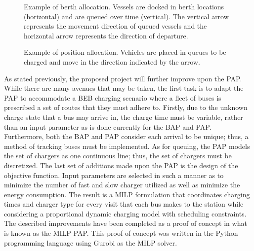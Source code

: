 \documentclass[ee,msthesis]{usuthesis}
\begin{document}
\begin{subfigures}
    \begin{figure}[htpb]
    \centering
        
        \caption{Example of berth allocation. Vessels are docked in berth locations (horizontal) and are queued over
          time (vertical). The vertical arrow represents the movement direction of queued vessels and the horizontal
          arrow represents the direction of departure.}
        \label{subfig:bapexample}
    \end{figure}
    \hfill

    \begin{figure}[htpb]
    \centering
        
        \caption{Example of position allocation. Vehicles are placed in queues to be charged and move in the direction
          indicated by the arrow.}
        \label{subfig:papexample}
    \end{figure}
\end{subfigures}

As stated previously, the proposed project will further improve upon the PAP. While there are many avenues that may be
taken, the first task is to adapt the PAP to accommodate a BEB charging scenario where a fleet of buses is prescribed a
set of routes that they must adhere to. Firstly, due to the unknown charge state that a bus may arrive in, the charge
time must be variable, rather than an input parameter as is done currently for the BAP and PAP. Furthermore, both the
BAP and PAP consider each arrival to be unique; thus, a method of tracking buses must be implemented. As for queuing,
the PAP models the set of chargers as one continuous line; thus, the set of chargers must be discretized. The last set
of additions made upon the PAP is the design of the objective function. Input parameters are selected in such a manner
as to minimize the number of fast and slow charger utilized as well as minimize the energy consumption. The result is a
MILP formulation that coordinates charging times and charger type for every visit that each bus makes to the station
while considering a proportional dynamic charging model with scheduling constraints. The described improvements have
been completed as a proof of concept in what is known as the MILP-PAP. This proof of concept was written in the Python
programming language using Gurobi as the MILP solver.
\end{document}
